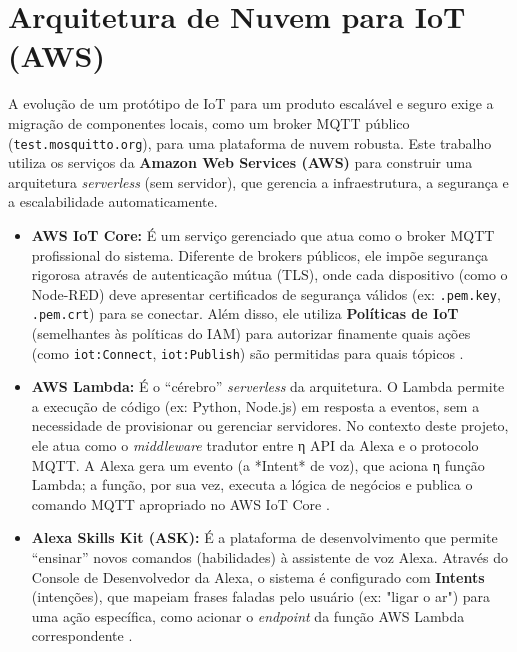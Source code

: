 
\section{Arquitetura de Nuvem para IoT (AWS)}
\label{sec:aws_theory}
A evolução de um protótipo de IoT para um produto escalável e seguro exige a migração de componentes locais, como um broker MQTT público (\texttt{test.mosquitto.org}), para uma plataforma de nuvem robusta.
Este trabalho utiliza os serviços da \textbf{Amazon Web Services (AWS)} para construir uma arquitetura \textit{serverless} (sem servidor), que gerencia a infraestrutura, a segurança e a escalabilidade automaticamente.
\begin{itemize}
    \item \textbf{AWS IoT Core:} É um serviço gerenciado que atua como o broker MQTT profissional do sistema.
Diferente de brokers públicos, ele impõe segurança rigorosa através de autenticação mútua (TLS), onde cada dispositivo (como o Node-RED) deve apresentar certificados de segurança válidos (ex: \texttt{.pem.key}, \texttt{.pem.crt}) para se conectar.
Além disso, ele utiliza \textbf{Políticas de IoT} (semelhantes às políticas do IAM) para autorizar finamente quais ações (como \texttt{iot:Connect}, \texttt{iot:Publish}) são permitidas para quais tópicos \cite{aws_iot_core_docs}.
\item \textbf{AWS Lambda:} É o ``cérebro'' \textit{serverless} da arquitetura. O Lambda permite a execução de código (ex: Python, Node.js) em resposta a eventos, sem a necessidade de provisionar ou gerenciar servidores.
No contexto deste projeto, ele atua como o \textit{middleware} tradutor entre η API da Alexa e o protocolo MQTT.
A Alexa gera um evento (a *Intent* de voz), que aciona η função Lambda;
a função, por sua vez, executa a lógica de negócios e publica o comando MQTT apropriado no AWS IoT Core \cite{aws_lambda_docs}.
\item \textbf{Alexa Skills Kit (ASK):} É a plataforma de desenvolvimento que permite ``ensinar'' novos comandos (habilidades) à assistente de voz Alexa.
Através do Console de Desenvolvedor da Alexa, o sistema é configurado com \textbf{Intents} (intenções), que mapeiam frases faladas pelo usuário (ex: "ligar o ar") para uma ação específica, como acionar o \textit{endpoint} da função AWS Lambda correspondente \cite{aws_alexa_iot}.
\end{itemize}

